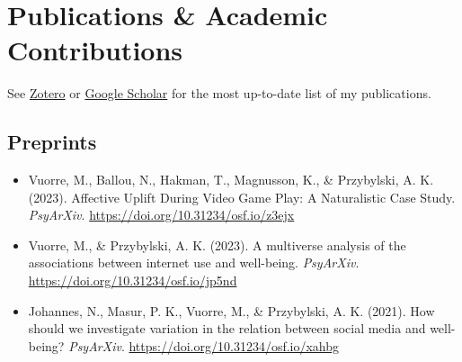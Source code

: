 \documentclass[12pt, a4paper]{article}
\begin{document}
\section*{Publications \& Academic Contributions}
See \href{https://www.zotero.org/vuorre}{Zotero} or \href{https://scholar.google.com/citations?hl=en&user=I4DSy-8AAAAJ&view_op=list_works&sortby=pubdate}{Google Scholar} for the most up-to-date list of my publications.

\subsection*{Preprints}
\begin{itemize}
  \item Vuorre, M., Ballou, N., Hakman, T., Magnusson, K., \& Przybylski, A. K. (2023). Affective Uplift During Video Game Play: A Naturalistic Case Study. \emph{PsyArXiv}. \url{https://doi.org/10.31234/osf.io/z3ejx}
  \item Vuorre, M., \& Przybylski, A. K. (2023). A multiverse analysis of the associations between internet use and well-being. \emph{PsyArXiv}. \url{https://doi.org/10.31234/osf.io/jp5nd}
  \item Johannes, N., Masur, P. K., Vuorre, M., \& Przybylski, A. K. (2021). How should we investigate variation in the relation between social media and well-being? \emph{PsyArXiv}. \url{https://doi.org/10.31234/osf.io/xahbg}
\end{itemize}
\end{document}
